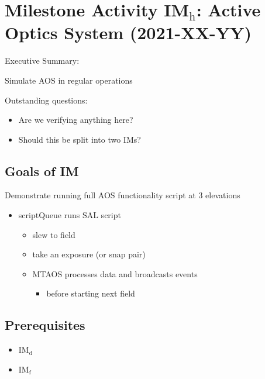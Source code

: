 \section{Milestone Activity IM\(_{\text{h}}\): Active Optics System                (2021-XX-YY)}
\label{sec:orgc4e66ed}
Executive Summary:

Simulate AOS in regular operations

Outstanding questions:
\begin{itemize}
\item Are we verifying anything here?
\item Should this be split into two IMs?
\end{itemize}

\subsection{Goals of IM}
Demonstrate running full AOS functionality script at 3 elevations
\begin{itemize}
\item scriptQueue runs SAL script
  \begin{itemize}
  \item slew to field
  \item take an exposure (or snap pair)
  \item MTAOS processes data and broadcasts events
    \begin{itemize}
    \item before starting next field
    \end{itemize}
  \end{itemize}
\end{itemize}

\subsection{Prerequisites}

\begin{itemize}
\item IM\(_{\text{d}}\)
\item IM\(_{\text{f}}\)
\end{itemize}
